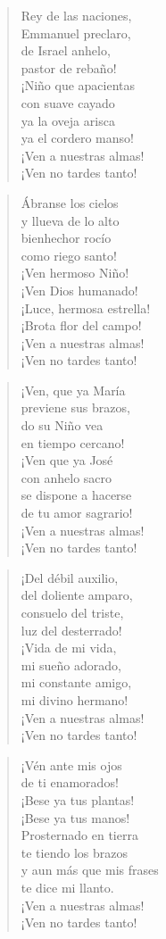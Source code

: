\documentclass[spanish,utf8,12pt]{chlart}
\newenvironment{gozo}{\begin{verse}\color{lector}}{\end{verse}}
\newcommand*\vena{{\color{responden}\hspace{1em}¡Ven a nuestras almas!\\\hspace{1em}¡Ven no tardes tanto!}}
\begin{document}
\begin{gozo}
Rey de las naciones,\\
Emmanuel preclaro,\\
de Israel anhelo,\\
pastor de rebaño!\\
¡Niño que apacientas\\
con suave cayado\\
ya la oveja arisca\\
ya el cordero manso!\\
\vena
\end{gozo}

\begin{gozo}
Ábranse los cielos\\
y llueva de lo alto\\
bienhechor rocío\\
como riego santo!\\
¡Ven hermoso Niño!\\
¡Ven Dios humanado!\\
¡Luce, hermosa estrella!\\
¡Brota flor del campo!\\
\vena
\end{gozo}

\begin{gozo}
¡Ven, que ya María\\
previene sus brazos,\\
do su Niño vea\\
en tiempo cercano!\\
¡Ven que ya José\\
con anhelo sacro\\
se dispone a hacerse\\
de tu amor sagrario!\\
\vena
\end{gozo}

\begin{gozo}
¡Del débil auxilio,\\
del doliente amparo,\\
consuelo del triste,\\
luz del desterrado!\\
¡Vida de mi vida,\\
mi sueño adorado,\\
mi constante amigo,\\
mi divino hermano!\\
\vena
\end{gozo}

\begin{gozo}
¡Vén ante mis ojos\\
de ti enamorados!\\
¡Bese ya tus plantas!\\
¡Bese ya tus manos!\\
Prosternado en tierra\\
te tiendo los brazos\\
y aun más que mis frases\\
te dice mi llanto.\\
\vena
\end{gozo}
\end{document}
